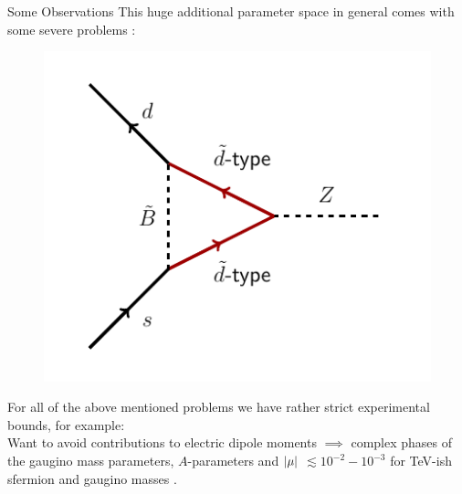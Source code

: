 \begin{frame}{Some Observations }
This huge additional parameter space in general comes with some severe problems :\\[1em]
\begin{minipage}{0.7\textwidth}
	
\end{minipage}
\begin{minipage}{0.29\textwidth}
	\begin{figure}
	\centering
		\includegraphics[scale = 0.6]{figures/fcnc_diagram}
	\end{figure}
\end{minipage}

For all of the above mentioned problems we have rather strict experimental bounds, for example:\\[1em]
Want to avoid contributions to \alert{electric dipole moments} $\implies$ complex phases of the gaugino mass parameters, $A$-parameters and $ \abs{\mu}$ $\lesssim  10^{-2} - 10^{-3}$ for TeV-ish sfermion and gaugino masses \cite{Fischler1992}.
\end{frame}

